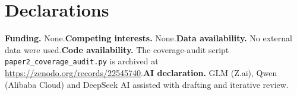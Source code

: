 \documentclass[10pt,twocolumn]{article}
\theoremstyle{definition}
\begin{document}
\section*{Declarations}

\textbf{Funding.} None.\quad \textbf{Competing interests.} None.\quad \textbf{Data availability.} No external data were used.\quad \textbf{Code availability.} The coverage-audit script \texttt{paper2\_coverage\_audit.py} is archived at \url{https://zenodo.org/records/22545740}.\quad \textbf{AI declaration.} GLM (Z.ai), Qwen (Alibaba Cloud) and DeepSeek AI assisted with drafting and iterative review.
\end{document}

